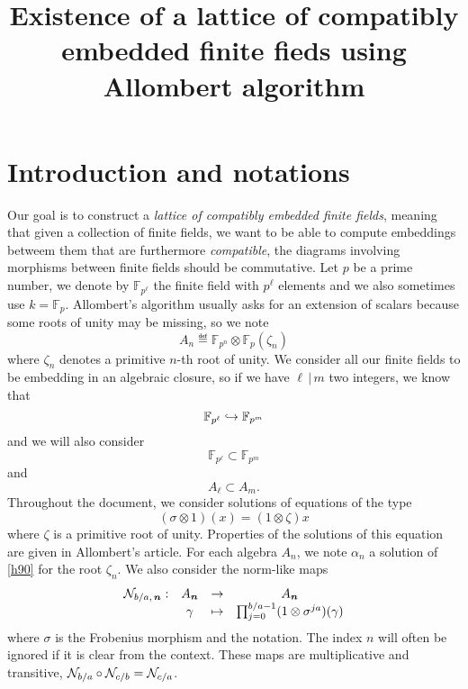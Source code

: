 \documentclass[a4paper,11pt]{article}
\title{Existence of a lattice of compatibly embedded finite fieds using
Allombert algorithm}
\author{}
\begin{document}
\maketitle





\section{Introduction and notations}
\label{sec:intro}

Our goal is to construct a \emph{lattice of compatibly embedded finite fields},
meaning that given a collection of finite fields, we want to be able to compute
embeddings betweem them that are furthermore \emph{compatible}, \ie the diagrams
involving morphisms between finite fields should be commutative. Let $p$ be a
prime number, we denote by $\mathbb{F}_{p^{\ell}}$ the finite field with
$p^\ell$ elements and we also sometimes use $k=\mathbb{F}_p$. Allombert's algorithm usually asks for an extension of
scalars because some roots of unity may be missing, so we note 
\[
  A_n \eqdef \mathbb{F}_{p^n}\otimes\mathbb{F}_{p}(\zeta_n)
\]
where $\zeta_n$ denotes a primitive $n$-th root of unity. We consider all our finite
fields to be embedding in an algebraic closure, so if we have $\ell\,|\,m$ two
integers, we know that
\[
  \mathbb{F}_{p^{\ell}}\hookrightarrow\mathbb{F}_{p^m}
\]
and we will also consider 
\[
  \mathbb{F}_{p^{\ell}}\subset\mathbb{F}_{p^m}
\]
and
\[
  A_{\ell}\subset A_m.
\]
Throughout the document, we consider solutions of equations of the type
\begin{equation}
  \tag{H90}
 (\sigma\otimes1)(x) = (1\otimes\zeta)x
  \label{h90}
\end{equation}
where $\zeta$ is a primitive root of unity. Properties of the solutions of this
equation are given in Allombert's article. For each algebra $A_n$, we note
$\alpha_n$ a solution of \eqref{h90} for the root $\zeta_n$. We also consider
the norm-like maps
\[
\begin{array}{cccc}
  \mathcal N_{b/a,\, \bm{n}}: & A_{\bm{n}} & \to &
  A_{\bm{n}} \\
  & \gamma & \mapsto & \prod_{j=0}^{b/a-1} (1 \otimes
  \sigma^{ja})(\gamma)
\end{array}
\]
where $\sigma$ is the Frobenius morphism and the notation. The index $n$ will often be
ignored if it is clear from the context. These maps are multiplicative and
transitive, \ie $\mathcal N_{b/a}\circ \mathcal N_{c/b} = \mathcal N_{c/a}$.
\end{document}
